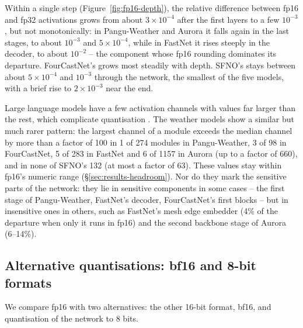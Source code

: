 Within a single step (Figure~\ref{fig:fp16-depth}), the
relative difference between fp16 and fp32 activations grows from about
$3\times10^{-4}$ after the first layers to a few $10^{-3}$, but not
monotonically: in Pangu-Weather and Aurora it falls again in the last stages, to about $10^{-3}$ and $5\times10^{-4}$, while in FastNet it rises steeply in the decoder, to about
$10^{-2}$ -- the component whose fp16 rounding dominates its departure.
FourCastNet's grows most steadily with depth. SFNO's stays between about
$5\times10^{-4}$ and $10^{-3}$ through the network, the smallest of the
five models, with a brief rise to $2\times10^{-3}$ near the end.

Large language models have a few activation channels with
values far larger than the rest, which complicate quantisation
\citep{dettmers2022llmint8}. The weather models show a similar but much
rarer pattern: the largest channel of a module exceeds the median channel
by more than a factor of 100 in 1 of 274 modules in Pangu-Weather, 3 of 98 in FourCastNet, 5 of 283 in FastNet and 6 of 1157 in Aurora (up to a factor of 660), and in none of SFNO's 132 (at most a factor of 63). These
values stay within fp16's numeric range (\S\ref{sec:results-headroom}). Nor do
they mark the sensitive parts of the network: they lie in sensitive
components in some cases -- the first stage of Pangu-Weather, FastNet's
decoder, FourCastNet's first blocks -- but in insensitive ones in others,
such as FastNet's mesh edge embedder (4\% of the departure when only it
runs in fp16) and
the second backbone stage of Aurora (6--14\%).

\subsection{Alternative quantisations: bf16 and 8-bit formats}
\label{sec:results-bf16}
\label{sec:results-alternatives}

We compare fp16 with two alternatives: the other 16-bit format, bf16, and
quantisation of the network to 8 bits.



